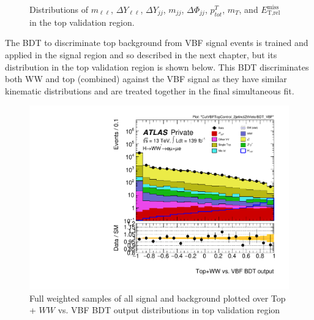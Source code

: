 \begin{figure}[!h]
{  }\hfill
  \hfill
{\caption{Distributions of $m_{\ell\ell}$, $\Delta Y_{\ell\ell}$, $\Delta Y_{jj}$, $m_{jj}$, $\Delta\Phi_{jj}$, $p^T_{tot}$, $m_T$, and $\ensuremath{E_{\text{T,rel}}^{\text{miss}}}$ in the top validation region.
\label{fig:TopCR3}}}
\end{figure}
The BDT to discriminate top background from VBF signal events is trained and applied in the signal region and so described in the next chapter, but its distribution in the top validation region is shown below. This BDT discriminates both WW and top (combined) against the VBF signal as they have similar kinematic distributions and are treated together in the final simultaneous fit. 

\begin{figure}[!htbp]
\centering
\includegraphics[width=.6\linewidth]{Pictures/run2-emme-CutVBFTopControl_2jetinclZttVeto-BDT_VBF-log.pdf}
\caption{Full weighted samples of all signal and background plotted over Top + $WW$ vs. VBF BDT output distributions in top validation region}
\label{fig:VBFTopWWBDTVR}
\end{figure}

